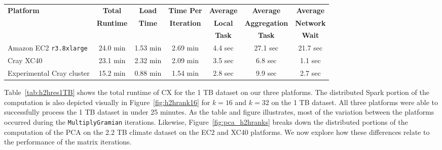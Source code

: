     \begin{table*}
    \begin{center}
    \begin{tabular}{| l | c | c | c | c | c | c |}
    \toprule
    \textbf{Platform} & \textbf{Total} & \textbf{Load} & \textbf{Time Per} & \textbf{Average} & \textbf{Average} & \textbf{Average} \\
                               & \textbf{Runtime} & \textbf{Time} & \textbf{Iteration} & \textbf{Local} & \textbf{Aggregation} & \textbf{Network} \\
                               & & & & \textbf{Task} & \textbf{Task} & \textbf{Wait} \\
    \midrule
    Amazon EC2 \texttt{r3.8xlarge} & 24.0 min & 1.53 min & 2.69 min & 4.4 sec & 27.1 sec & 21.7 sec \\
    \midrule
    Cray XC40 & 23.1 min& 2.32 min & 2.09 min &  3.5 sec & 6.8 sec & 1.1 sec \\
    \midrule
    Experimental Cray cluster & 15.2 min & 0.88 min & 1.54 min &  2.8 sec & 9.9 sec & 2.7 sec \\
   \bottomrule
    \end{tabular}
    \end{center}
    \caption{Total runtime for the 1 TB dataset ($k=16$), broken down into load time and per-iteration time. The per-iteration time is further broken down into the average time for each task of the local stage and each task of the aggregation stage.  We also show the average amount of time spent waiting for a network fetch, to illustrate the impact of the interconnect.}
    \label{tab:h2hres1TB}
    \end{table*}
    
Table~\ref{tab:h2hres1TB} shows the total runtime of CX for the 1 TB dataset on
our three platforms.  The distributed Spark portion of the computation is also
depicted visually in Figure~\ref{fig:h2hrank16} for $k=16$ and $k=32$ on the 1
TB dataset.  All three platforms were able to successfully process the 1 TB
dataset in under 25 minutes.  As the table and figure illustrates, most of the
variation between the platforms occurred during the \texttt{MultiplyGramian}
iterations. Likewise, Figure~\ref{fig:pca_h2hranks} breaks down the distributed
portions of the computation of the PCA on the 2.2 TB climate dataset on the EC2
and XC40 platforms.  We now explore how these differences relate to the performance of the
matrix iterations.

